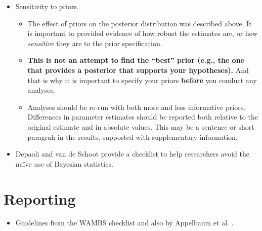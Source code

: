 \documentclass[
  a4paper,
  DIV=11,
  numbers=noendperiod]{scrreprt}
\providecommand{\tightlist}{%
  \setlength{\itemsep}{0pt}\setlength{\parskip}{0pt}}\usepackage{longtable,booktabs,array}
\begin{document}
\begin{itemize}
\begin{itemize}
\begin{itemize}
      \begin{itemize}
      \tightlist
      \item
        In Mplus, with a single chain, PSR is defined using the third
        and fourth quarters of the chain.
      \end{itemize}
    \item
      Kolmogorov-Smirnov (K-S) tests: a test of equality of the
      posterior parameter distributions across the different chains
      using draws from the chains.
    \item
      Geweke z-statistic: compares the first and last half of the post
      burn-in iterations. Significant test is evidence of local
      convergence.
    \end{itemize}
  \end{itemize}
\item
  Sensitivity to priors.

  \begin{itemize}
  \tightlist
  \item
    The effect of priors on the posterior distribution was described
    above. It is important to provided evidence of how robust the
    estimates are, or how \emph{sensitive} they are to the prior
    specification.
  \item
    \textbf{This is not an attempt to find the ``best'' prior (e.g., the
    one that provides a posterior that supports your hypotheses).} And
    that is why it is important to specify your priors \textbf{before}
    you conduct any analyses.
  \item
    Analyses should be re-run with both more and less informative
    priors. Differences in parameter estimates should be reported both
    relative to the original estimate and in absolute values. This may
    be a sentence or short paragrah in the results, supported with
    supplementary information.
  \end{itemize}
\item
  Depaoli and van de Schoot \citep{Depaoli2017} provide a checklist to
  help researchers avoid the naïve use of Bayesian statistics.
\end{itemize}

\section{Reporting}\label{reporting}

\begin{itemize}
\tightlist
\item
  Guidelines from the WAMBS checklist and also by Appelbaum et al.
  \citeyearpar[pp 17-20]{Appelbaum2018}.
\end{itemize}
\end{document}
